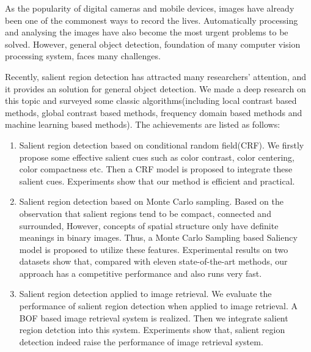 \begin{englishabstract}

As the popularity of digital cameras and mobile devices, images have already been one of the commonest ways to record the lives. Automatically processing and analysing the images have also become the most urgent problems to be solved. However, general object detection, foundation of many computer vision processing system, faces many challenges.

Recently, salient region detection has attracted many researchers' attention, and it provides an solution for general object detection. We made a deep research on this topic and surveyed some classic algorithms(including local contrast based methods, global contrast based methods, frequency domain based methods and machine learning based methods). The achievements are listed as follows:
\begin{enumerate}
  \item Salient region detection based on conditional random field(CRF). We firstly propose some effective salient cues such as color contrast, color centering, color compactness etc. Then a CRF model is proposed to integrate these salient cues. Experiments show that our method is efficient and practical.
  \item Salient region detection based on Monte Carlo sampling. Based on the observation that salient regions tend to be compact, connected and surrounded, However, concepts of spatial structure only have definite meanings in binary images. Thus, a Monte Carlo Sampling based Saliency model is proposed to utilize these features. Experimental results on two datasets show that, compared with eleven state-of-the-art methods, our approach has a competitive performance and also runs very fast.
  \item Salient region detection applied to image retrieval. We evaluate the performance of salient region detection when applied to image retrieval. A BOF based image retrieval system is realized. Then we integrate salient region detction into this system. Experiments show that, salient region detection indeed raise the performance of image retrieval system.
\end{enumerate}


\end{englishabstract}
